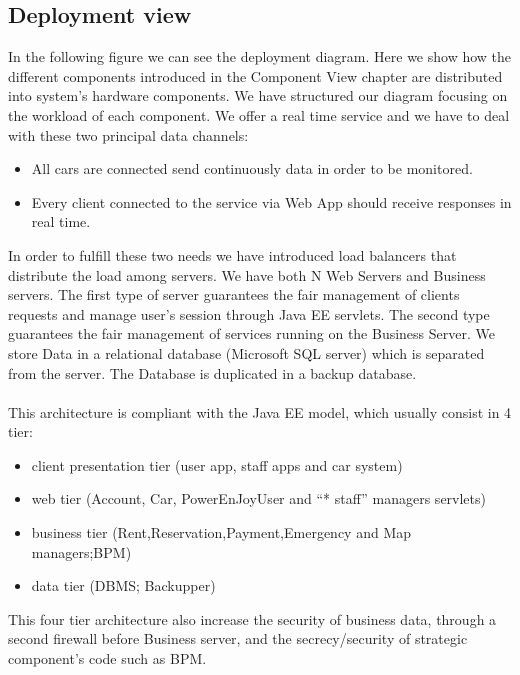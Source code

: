 \documentclass[english]{article}
\begin{document}
	\subsection{Deployment view}
	In the following figure we can see the deployment diagram. Here we show how the different components introduced in the Component View chapter are distributed into system's hardware components.
We have structured our diagram focusing on the workload of each component. We offer a real time service and we have to deal with these two principal data channels:
	\begin{itemize}
		\item All cars are connected send continuously data in order to be monitored. 
		\item Every client connected to the service via Web App should receive responses in real time.
	\end {itemize}
In order to fulfill these two needs we have introduced load balancers that distribute the load among servers. 
We have both N Web Servers and Business servers. The first type of server guarantees the fair management of clients requests and manage user's session through Java EE servlets. The second type guarantees the fair management of services running on the Business Server.
We store Data in a relational database (Microsoft SQL server) which is separated from the server. The Database is duplicated in a backup database.\\\\
This architecture is compliant with the Java EE model, which usually consist in 4 tier: 
		\begin{itemize}
			\item{ client presentation tier (user app, staff apps and car system)}
			\item{ web tier (Account, Car, PowerEnJoyUser and  ``* staff'' managers servlets)}
			\item{ business tier (Rent,Reservation,Payment,Emergency and Map managers;BPM)}
			\item{ data tier (DBMS; Backupper) }
		\end{itemize}
		This four tier architecture also increase the security of business data, through a second firewall before Business server, and the secrecy/security of strategic component's code such as BPM.
		
\end{document}
